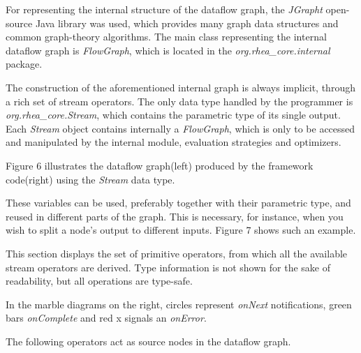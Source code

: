 \documentclass{dithesis}
\begin{document}

For representing the internal structure of the dataflow graph, the \textit{JGrapht} open-source Java library was used, which provides many graph data structures and common graph-theory algorithms. The main class representing the internal dataflow graph is \textit{FlowGraph},  which is located in the \textit{org.rhea\_core.internal} package.


The construction of the aforementioned internal graph is always implicit, through a rich set of stream operators. The only data type handled by the programmer is \textit{org.rhea\_core.Stream}, which contains the parametric type of its single output. Each \textit{Stream} object contains internally a \textit{FlowGraph}, which is only to be accessed and manipulated by the internal module, evaluation strategies and optimizers.

Figure 6 illustrates the dataflow graph(left) produced by the framework code(right) using the \textit{Stream} data type.


These variables can be used, preferably together with their parametric type, and reused in different parts of the graph. This is necessary, for instance, when you wish to split a node's output to different inputs. Figure 7 shows such an example.


This section displays the set of primitive operators, from which all the available stream operators are derived. Type information is not shown for the sake of readability, but all operations are type-safe.

In the marble diagrams on the right, circles represent \textit{onNext} notifications, green bars \textit{onComplete} and red x signals an \textit{onError}.

\newcommand{\lll}{0.4\linewidth}
\newcommand{\rrr}{0.4\linewidth}

The following operators act as source nodes in the dataflow graph.
\begin{description}
\end{description}
\end{document}
